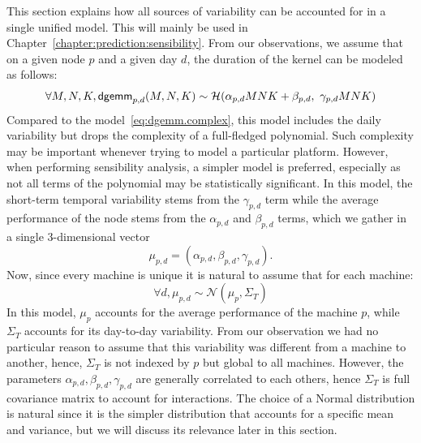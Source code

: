             This section explains how all sources of variability can be accounted for in a single unified model. This
            will mainly be used in Chapter~\ref{chapter:prediction:sensibility}. From our observations, we assume that
            on a given node \(p\) and a given day \(d\), the duration of the \dgemm kernel can be modeled as follows:
            \begin{equation}
                \label{eq:dgemm.basic}
                \forall M,N,K, \textsf{dgemm}_{p,d}(M, N, K) \sim \mathcal{H}(\alpha_{p,d}MNK + \beta_{p,d}, \,\, \gamma_{p,d}MNK)\\
            \end{equation}
            Compared to the model~\eqref{eq:dgemm.complex}, this model includes the daily variability but drops the
            complexity of a full-fledged polynomial. Such complexity may be important whenever trying to model a
            particular platform. However, when performing sensibility analysis, a simpler model is preferred, especially
            as not all terms of the polynomial may be statistically significant. In this model, the short-term temporal
            variability stems from the \(\gamma_{p,d}\) term while the average performance of the node stems from the
            \(\alpha_{p,d}\) and \(\beta_{p,d}\) terms, which we gather in a single 3-dimensional vector
            \begin{equation}
              \mu_{p,d}=(\alpha_{p,d},\beta_{p,d},\gamma_{p,d}).
            \end{equation}
            Now, since every machine is unique it is natural to assume that for each machine:
            \begin{equation}
                \label{eq:dgemm.temporal}
                \forall d, \mu_{p,d} \sim \mathcal{N}(\mu_{p},\Sigma_T)
            \end{equation}
            In this model, \(\mu_{p}\) accounts for the average performance of the machine \(p\), while \(\Sigma_T\)
            accounts for its day-to-day variability. From our observation we had no particular reason to assume that
            this variability was different from a machine to another, hence, \(\Sigma_T\) is not indexed by \(p\) but
            global to all machines. However, the parameters \(\alpha_{p,d},\beta_{p,d},\gamma_{p,d}\) are generally
            correlated to each others, hence \(\Sigma_T\) is full covariance matrix to account for interactions.  The
            choice of a Normal distribution is natural since it is the simpler distribution that accounts for a specific
            mean and variance, but we will discuss its relevance later in this section.

